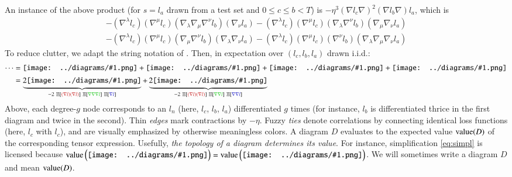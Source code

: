 \documentclass{article}
\newcommand{\dvalue}{\text{\textnormal{value}}}
\newcommand{\expct}[1]{\mathbb{E}\left[#1\right]}
\newcommand{\wrap}[1]{\left(#1\right)}
\newcommand{\sdia}[1]{\begin{gathered}\texttt{[image: ../diagrams/\#1.png]}\end{gathered}}
\begin{document}
        An instance of the above product (for $s=l_a$ drawn from a test set and
        $0\leq c\leq b<T$) is $-\eta^3 (\nabla l_c \nabla)^2 (\nabla l_b
        \nabla) l_a$, which is
        {\small
        \begin{align*}
            - (\nabla^\lambda l_c) (\nabla^\mu l_c) (\nabla_\lambda \nabla_\mu \nabla^\nu l_b) (\nabla_\nu l_a)   
            - (\nabla^\lambda l_c) (\nabla^\mu l_c) (\nabla_\lambda \nabla^\nu l_b) (\nabla_\mu \nabla_\nu l_a) \\
            - (\nabla^\lambda l_c) (\nabla^\mu l_c) (\nabla_\mu \nabla^\nu l_b) (\nabla_\lambda \nabla_\nu l_a)   
            - (\nabla^\lambda l_c) (\nabla^\mu l_c) (\nabla^\nu l_b) (\nabla_\lambda \nabla_\mu \nabla_\nu l_a)
        \end{align*}
        }
        To reduce clutter, we adapt the string notation of \citet{fe49, pe71}.
        Then, in expectation over $(l_c, l_b, l_a)$ drawn i.i.d.:
        \begin{align}
            \cdots
            &= 
                 \sdia{(01-2-3)(02-12-23)}
                +\sdia{(01-2-3)(02-13-23)}
                +\sdia{(01-2-3)(03-12-23)}
                +\sdia{(01-2-3)(03-13-23)} \\
                \label{eq:simpl}
            &=
                \underbrace{2\sdia{(01-2-3)(02-12-23)}}_{
                   -2~\expct{{\color{moor}(\nabla l)(\nabla l)}}~\expct{{\color{moog}\nabla\nabla\nabla l}}~\expct{{\color{moob} \nabla l}}
                }
                +
                \underbrace{2\sdia{(01-2-3)(02-13-23)}}_{
                   -2~\expct{{\color{moor}(\nabla l)(\nabla l)}}~\expct{{\color{moog}\nabla \nabla l}}~\expct{{\color{moob}\nabla \nabla l}}
                }
        \end{align}
        Above, each degree-$g$ node corresponds to an $l_n$ (here,
            {\color{moor} $l_c$},
            {\color{moog} $l_b$},
            {\color{moob} $l_a$}) differentiated $g$ times
        (for instance, {\color{moog} $l_b$} is differentiated thrice in the
        first diagram and twice in the second).  Thin \emph{edges} mark
        contractions by $-\eta$.  Fuzzy \emph{ties} denote correlations by
        connecting identical loss functions (here, {\color{moor} $l_c$} with
        {\color{moor} $l_c$}), and are visually emphasized by otherwise
        meaningless colors.  A diagram $D$ evaluates to the expected value
        $\dvalue(D)$ of the corresponding tensor expression.
        Usefully, %
        \emph{the topology of a diagram determines its value}.  For instance,
        simplification \ref{eq:simpl} is licensed because
        $
            \dvalue\wrap{\sdia{(01-2-3)(02-12-23)}}
            =
            \dvalue\wrap{\sdia{(01-2-3)(03-13-23)}}
        $.
        We will sometimes write a diagram $D$ and mean $\dvalue(D)$. 
    
\end{document}
